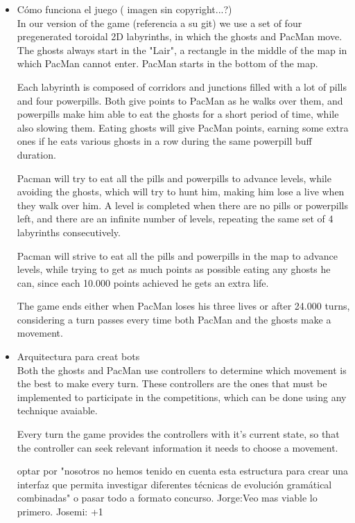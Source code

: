 \documentclass{llncs}
\begin{document}
\begin{itemize}
\item Cómo funciona el juego ({\color{red} imagen sin copyright...?})
\\

In our version of the game {\color{red}(referencia a su git)} we use a set of four pregenerated toroidal 2D labyrinths, in which the ghosts and PacMan move. The ghosts always start in the "Lair", a rectangle in the middle of the map in which PacMan cannot enter. PacMan starts in the bottom of the map.

Each labyrinth is composed of corridors and junctions filled with a lot of pills and four powerpills. Both give points to PacMan as he walks over them, and powerpills make him able to eat the ghosts for a short period of time, while also slowing them. Eating ghosts will give PacMan points, earning some extra ones if he eats various ghosts in a row during the same powerpill buff duration.

Pacman will try to eat all the pills and powerpills to advance levels, while avoiding the ghosts, which will try to hunt him, making him lose a live when they walk over him. A level is completed when there are no pills or powerpills left, and there are an infinite number of levels, repeating the same set of 4 labyrinths consecutively.

Pacman will strive to eat all the pills and powerpills in the map to advance levels, while trying to get as much points as possible eating any ghosts he can, since each 10.000 points achieved he gets an extra life.

The game ends either when PacMan loses his three lives or after 24.000 turns, considering a turn passes every time both PacMan and the ghosts make a movement.


\item Arquitectura para creat bots
\\

Both the ghosts and PacMan use controllers to determine which movement is the best to make every turn. These controllers are the ones that must be implemented to participate in the competitions, which can be done using any technique avaiable.

Every turn the game provides the controllers with it's current state, so that the controller can seek relevant information it needs to choose a movement. 

{\color{red}optar por "nosotros no hemos tenido en cuenta esta estructura para crear una interfaz que permita investigar diferentes técnicas de evolución gramátical combinadas" o pasar todo a formato concurso. Jorge:Veo mas viable lo primero. Josemi: +1}
\\


\end{itemize}
\end{document}
